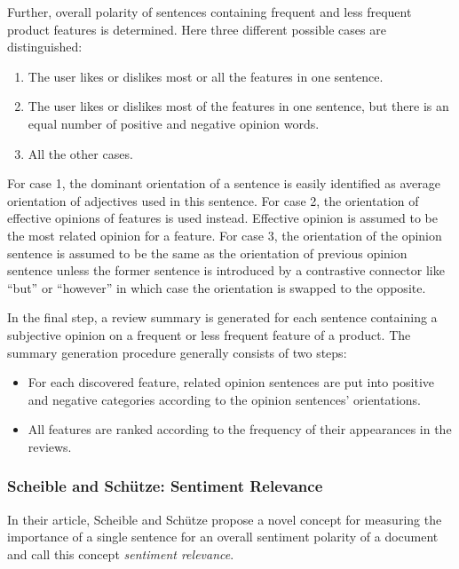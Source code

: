 \documentclass[a4paper,11pt]{article}
\begin{document}
Further, overall polarity of sentences containing frequent and less frequent
product features is determined.  Here three different possible cases are
distinguished:
\begin{enumerate}
  \item The user likes or dislikes most or all the features in one sentence.
  \item The user likes or dislikes most of the features in one sentence, but
    there is an equal number of positive and negative opinion words.
  \item All the other cases.
\end{enumerate}
For case 1, the dominant orientation of a sentence is easily identified as
average orientation of adjectives used in this sentence.  For case 2, the
orientation of effective opinions of features is used instead.  Effective
opinion is assumed to be the most related opinion for a feature.  For case 3,
the orientation of the opinion sentence is assumed to be the same as the
orientation of previous opinion sentence unless the former sentence is
introduced by a contrastive connector like ``but'' or ``however'' in which
case the orientation is swapped to the opposite.

In the final step, a review summary is generated for each sentence containing
a subjective opinion on a frequent or less frequent feature of a product.  The
summary generation procedure generally consists of two steps:
\begin{itemize}
  \item For each discovered feature, related opinion sentences are put into
    positive and negative categories according to the opinion sentences'
    orientations.

  \item All features are ranked according to the frequency of their
    appearances in the reviews.
\end{itemize}

\subsubsection{Scheible and Sch\"utze: Sentiment Relevance\cite{Scheible-13}}

In their article, Scheible and Sch\"utze propose a novel concept for
measuring the importance of a single sentence for an overall sentiment
polarity of a document and call this concept \textit{sentiment
  relevance}.
\end{document}
